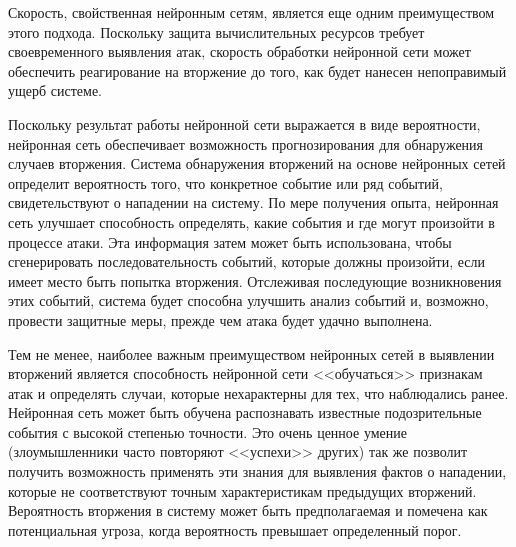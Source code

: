 Скорость, свойственная нейронным сетям, является еще одним преимуществом этого подхода. Поскольку защита вычислительных ресурсов требует своевременного выявления атак, скорость обработки нейронной сети может обеспечить реагирование на вторжение до того, как будет нанесен непоправимый ущерб системе.\par 

Поскольку результат работы нейронной сети выражается в виде вероятности, нейронная сеть обеспечивает возможность прогнозирования для обнаружения случаев вторжения. Система обнаружения вторжений на основе нейронных сетей определит вероятность того, что конкретное событие или ряд событий, свидетельствуют о нападении на систему. По мере получения опыта, нейронная сеть улучшает способность определять, какие события и где могут произойти в процессе атаки. Эта информация затем может быть использована, чтобы сгенерировать последовательность событий, которые должны произойти, если имеет место быть попытка вторжения. Отслеживая последующие возникновения этих событий, система будет способна улучшить анализ событий и, возможно, провести защитные меры, прежде чем атака будет удачно выполнена.\par 

Тем не менее, наиболее важным преимуществом нейронных сетей в выявлении вторжений является  способность нейронной сети <<обучаться>> признакам атак и определять случаи, которые нехарактерны для тех, что наблюдались ранее. Нейронная сеть может быть обучена распознавать известные подозрительные события с высокой степенью точности. Это очень ценное умение (злоумышленники часто повторяют <<успехи>> других) так же позволит получить возможность применять эти знания для выявления фактов о нападении, которые не соответствуют точным характеристикам предыдущих вторжений. Вероятность вторжения в систему может быть предполагаемая и помечена как потенциальная угроза, когда вероятность превышает определенный порог.\par 
